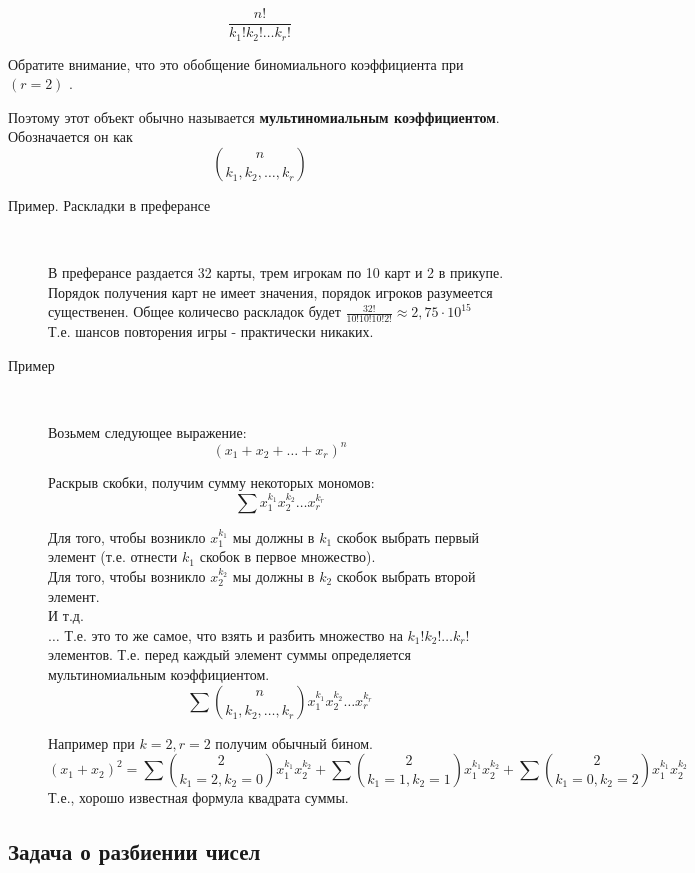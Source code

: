 $$
\frac{n!}{k_1! k_2! \ldots k_r!}
$$

Обратите внимание, что это обобщение биномиального коэффициента при $(r=2)$ .

Поэтому этот объект обычно называется \textbf{мультиномиальным коэффициентом}. Обозначается он как
$$
\binom{n}{k_1, k_2, \ldots, k_r}
$$


\begin{description}
\item[Пример. Раскладки в преферансе]~	

В преферансе раздается 32 карты, трем игрокам по 10 карт и 2 в прикупе. Порядок получения карт не имеет значения, порядок игроков разумеется существенен. Общее количесво раскладок будет $ \frac{32!}{10!10!10!2!} \approx 2,75 \cdot 10^{15} $ \\
Т.е. шансов повторения игры - практически никаких.

\end{description}

\begin{description}
\item[Пример]~	

Возьмем следующее выражение:
$$
(x_1 + x_2 + \ldots + x_r)^n
$$

Раскрыв скобки, получим сумму некоторых мономов:
$$
\sum x_1^{k_1} x_2^{k_2} \ldots x_r^{k_r}
$$

Для того, чтобы возникло $x_1^{k_1}$ мы должны в $k_1$ скобок выбрать первый элемент (т.е. отнести $k_1$ скобок в первое множество). \\
Для того, чтобы возникло $x_2^{k_2}$ мы должны в $k_2$ скобок выбрать второй элемент. \\
И т.д. \\
$\ldots$
Т.е. это то же самое, что взять и разбить множество на ${k_1! k_2! \ldots k_r!}$ элементов.
Т.е. перед каждый элемент суммы определяется мультиномиальным коэффициентом.
$$
\sum \binom{n}{k_1, k_2, \ldots, k_r} x_1^{k_1} x_2^{k_2} \ldots x_r^{k_r}
$$

Например при $k=2, r=2$ получим обычный бином.
$$
(x_1 + x_2)^2 = \sum \binom{2}{k_1=2, k_2=0} x_1^{k_1} x_2^{k_2} 
+ \sum \binom{2}{k_1=1, k_2=1} x_1^{k_1} x_2^{k_2}
+ \sum \binom{2}{k_1=0, k_2=2} x_1^{k_1} x_2^{k_2}
$$
Т.е., хорошо известная формула квадрата суммы.
\end{description}

\subsection{Задача о разбиении чисел}

